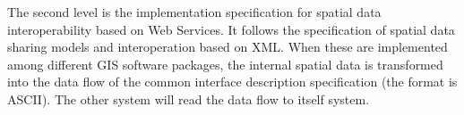 \documentclass[12pt,a4paper]{report}
\begin{document}
\begin{itemize}
		The  second  level  is  the  implementation  specification for spatial data interoperability based on Web Services. It  follows  the  specification  of  spatial  data  sharing models and interoperation based on XML. When these are    implemented    among    different    GIS    software packages,  the  internal  spatial  data  is  transformed  into the  data  flow  of  the  common  interface  description specification  (the  format  is  ASCII).  The  other  system will read the data flow to itself system.
	\end{itemize} 

	\renewcommand{\bibname}{References}
	
	
\end{document}
